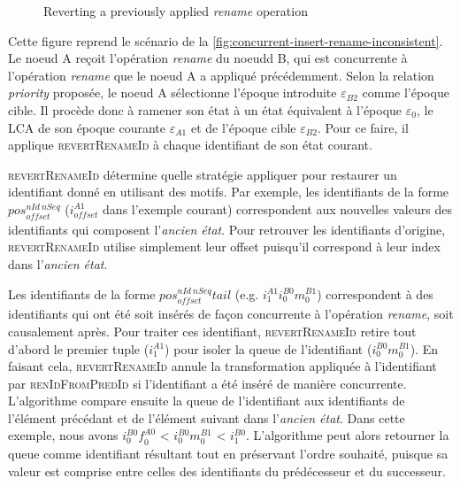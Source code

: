 \documentclass[12pt]{thesul}
\newcommand{\eg}{e.g. }
\newcommand{\trm}[1]{\mathit{#1}}
\newcommand{\id}[3]{$\trm{#1}^{\trm{#2}}_{\trm{#3}}$}
\newcommand{\epoch}[1]{$\varepsilon_{#1}$}
\begin{document}
\begin{figure}[!ht]
  \caption{Reverting a previously applied \emph{rename} operation}
  \label{fig:revertRenameId}
\end{figure}

Cette figure reprend le scénario de la \autoref{fig:concurrent-insert-rename-inconsistent}.
Le noeud A reçoit l'opération \emph{rename} du noeudd B, qui est concurrente à l'opération \emph{rename} que le noeud A a appliqué précédemment.
Selon la relation \emph{priority} proposée, le noeud A sélectionne l'époque introduite \epoch{B2} comme l'époque cible.
Il procède donc à ramener son état à un état équivalent à l'époque \epoch{0}, le \ac{LCA} de son époque courante \epoch{A1} et de l'époque cible \epoch{B2}.
Pour ce faire, il applique \textsc{revertRenameId} à chaque identifiant de son état courant.

\textsc{revertRenameId} détermine quelle stratégie appliquer pour restaurer un identifiant donné en utilisant des motifs.
Par exemple, les identifiants de la forme \id{pos}{nId~nSeq}{offset} (\id{i}{A1}{offset} dans l'exemple courant) correspondent aux nouvelles valeurs des identifiants qui composent l'\emph{ancien état}.
Pour retrouver les identifiants d'origine, \textsc{revertRenameId} utilise simplement leur offset puisqu'il correspond à leur index dans l'\emph{ancien état}.

Les identifiants de la forme \id{pos}{nId~nSeq}{offset}$\trm{tail}$ (\eg \id{i}{A1}{1}\id{i}{B0}{0}\id{m}{B1}{0}) correspondent à des identifiants qui ont été soit insérés de façon concurrente à l'opération \emph{rename}, soit causalement après.
Pour traiter ces identifiant, \textsc{revertRenameId} retire tout d'abord le premier tuple (\id{i}{A1}{1}) pour isoler la queue de l'identifiant (\id{i}{B0}{0}\id{m}{B1}{0}).
En faisant cela, \textsc{revertRenameId} annule la transformation appliquée à l'identifiant par \textsc{renIdFromPredId} si l'identifiant a été inséré de manière concurrente.
L'algorithme compare ensuite la queue de l'identifiant aux identifiants de l'élément précédant et de l'élément suivant dans l'\emph{ancien état}.
Dans cette exemple, nous avons \id{i}{B0}{0}\id{f}{A0}{0} < \id{i}{B0}{0}\id{m}{B1}{0} < \id{i}{B0}{1}.
L'algorithme peut alors retourner la queue comme identifiant résultant tout en préservant l'ordre souhaité, puisque sa valeur est comprise entre celles des identifiants du prédécesseur et du successeur.
\end{document}
